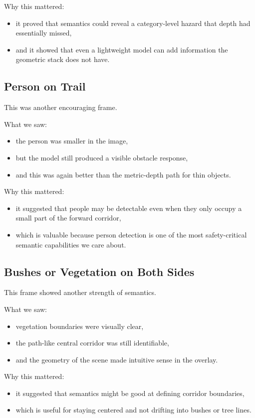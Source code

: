 \documentclass[11pt]{article}
\begin{document}
Why this mattered:
\begin{itemize}[leftmargin=*]
\item it proved that semantics could reveal a category-level hazard that depth had essentially missed,
\item and it showed that even a lightweight model can add information the geometric stack does not have.
\end{itemize}

\subsection{Person on Trail}
This was another encouraging frame.

What we saw:
\begin{itemize}[leftmargin=*]
\item the person was smaller in the image,
\item but the model still produced a visible obstacle response,
\item and this was again better than the metric-depth path for thin objects.
\end{itemize}

Why this mattered:
\begin{itemize}[leftmargin=*]
\item it suggested that people may be detectable even when they only occupy a small part of the forward corridor,
\item which is valuable because person detection is one of the most safety-critical semantic capabilities we care about.
\end{itemize}

\subsection{Bushes or Vegetation on Both Sides}
This frame showed another strength of semantics.

What we saw:
\begin{itemize}[leftmargin=*]
\item vegetation boundaries were visually clear,
\item the path-like central corridor was still identifiable,
\item and the geometry of the scene made intuitive sense in the overlay.
\end{itemize}

Why this mattered:
\begin{itemize}[leftmargin=*]
\item it suggested that semantics might be good at defining corridor boundaries,
\item which is useful for staying centered and not drifting into bushes or tree lines.
\end{itemize}
\end{document}
